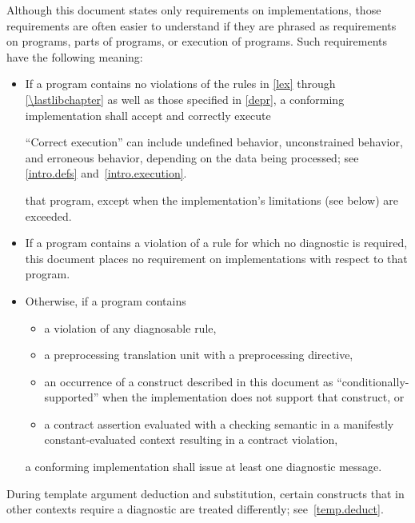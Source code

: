 \pnum
{}%
Although this document states only requirements on \Cpp{}
implementations, those requirements are often easier to understand if
they are phrased as requirements on programs, parts of programs, or
execution of programs. Such requirements have the following meaning:
\begin{itemize}
\item
If a program contains no violations of the rules in
\ref{lex} through \ref{\lastlibchapter} as well as those specified in \ref{depr},
a conforming implementation shall accept and correctly execute
\begin{footnote}
``Correct execution'' can include undefined behavior,
unconstrained behavior,
and erroneous behavior, depending on
the data being processed; see \ref{intro.defs} and~\ref{intro.execution}.
\end{footnote}
that program,
except when the implementation's limitations (see below) are exceeded.
\item
{}%
If a program contains a violation of a rule for which no diagnostic is required,
this document places no requirement on implementations
with respect to that program.

\item
{}%
%
%
Otherwise, if a program contains
\begin{itemize}
\item
a violation of any diagnosable rule,
\item
a preprocessing translation unit with
a  preprocessing directive,
\item
an occurrence
of a construct described in this document as ``conditionally-supported'' when
the implementation does not support that construct, or
\item
a contract assertion
evaluated with a checking semantic
in a manifestly constant-evaluated context
resulting in a contract violation,
\end{itemize}
a conforming implementation
shall issue at least one diagnostic message.
\end{itemize}
\begin{note}
During template argument deduction and substitution,
certain constructs that in other contexts require a diagnostic
are treated differently;
see~\ref{temp.deduct}.
\end{note}
